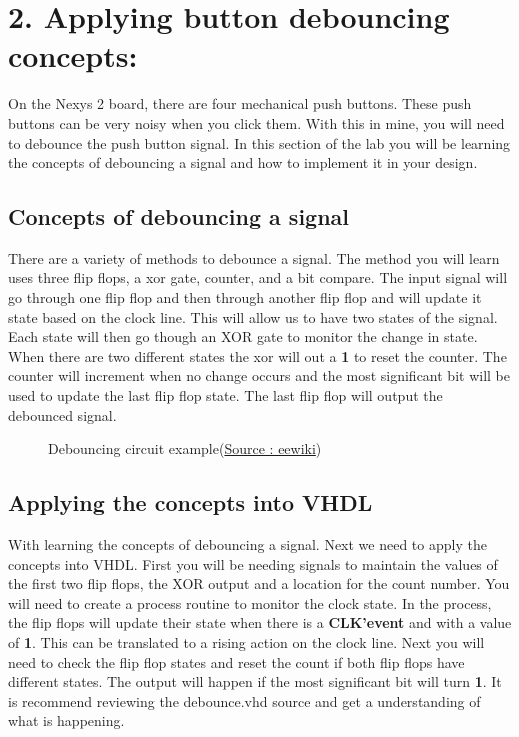 \documentclass{article}
\begin{document}
\newpage

\section{2. Applying button debouncing concepts:}
On the Nexys 2 board, there are four mechanical push buttons. These push buttons can be very noisy when you click them. With this in mine, you will need to debounce the push button signal. In this section of the lab you will be learning the concepts of debouncing a signal and how to implement it in your design.

\subsection{Concepts of debouncing a signal}
There are a variety of methods to debounce a signal. The method you will learn uses three flip flops, a xor gate, counter, and a bit compare. The input signal will go through one flip flop and then through another flip flop and will update it state based on the clock line. This will allow us to have two states of the signal. Each state will then go though an XOR gate to monitor the change in state. When there are two different states the xor will out a \textbf{1} to reset the counter. The counter will increment when no change occurs and the most significant bit will be used to update the last flip flop state. The last flip flop will output the debounced signal.

\begin{figure}[!htb]
  \centering
  \caption{Debouncing circuit example(\href{http://eewiki.net/x/FgBM}{Source : eewiki})}
\end{figure}

\subsection{Applying the concepts into VHDL}
With learning the concepts of debouncing a signal. Next we need to apply the concepts into VHDL. First you will be needing signals to maintain the values of the first two flip flops, the XOR output and a location for the count number. You will need to create a process routine to monitor the clock state. In the process, the flip flops will update their state when there is a \textbf{CLK'event} and with a value of \textbf{1}. This can be translated to a rising action on the clock line. Next you will need to check the flip flop states and reset the count if both flip flops have different states. The output will happen if the most significant bit will turn \textbf{1}. It is recommend reviewing the debounce.vhd source and get a understanding of what is happening.
\end{document}

